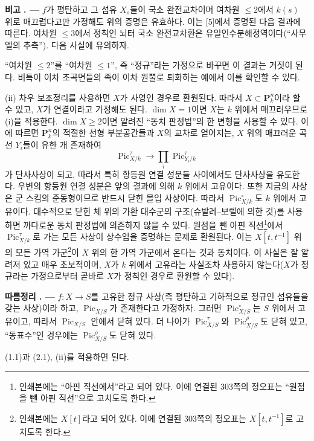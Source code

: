 \documentclass[11pt,twoside,openany]{book}
\numberwithin{equation}{section}
\newcommand{\sourceunit}{front}
\newcommand{\src}[1]{%
  \phantomsection\hypertarget{src:\sourceunit:#1}{}%
  \marginpar{\raggedleft\footnotesize\sffamily #1}%
}
\theoremstyle{plain}
\theoremstyle{definition}
\theoremstyle{remark}
\newcommand{\result}[2]{%
  \par\medskip\noindent\textbf{#1%
  \if\relax\detokenize{#2}\relax\else\space#2\fi. ---}\enspace
}
\begin{document}
\result{비고}{2.2} $f$가 평탄하고 그 섬유 $X_s$들이 국소 완전교차이며
여차원 $\leq2$에서 $k(s)$ 위로 매끄럽다고만 가정해도 위의 증명은 유효하다.
이는 [5]에서 증명된 다음 결과에 따른다. 여차원 $\leq3$에서 정칙인 뇌터
국소 완전교차환은 유일인수분해정역이다(``사무엘의 추측''). 다음 사실에
유의하자.

\src{232}
``여차원 $\leq2$''를 ``여차원 $\leq1$'', 즉 ``정규''라는 가정으로
바꾸면 이 결과는 거짓이 된다. 비특이 이차 초곡면들의 족이 이차 원뿔로
퇴화하는 예에서 이를 확인할 수 있다.

(ii) 차우 보조정리를 사용하면 $X$가 사영인 경우로 환원된다. 따라서
$X\subset\mathbf P_k^n$이라 할 수 있고, $X$가 연결이라고 가정해도 된다.
$\dim X=1$이면 $X$는 $k$ 위에서 매끄러우므로 (i)을 적용한다.
$\dim X\geq2$이면 알려진 ``동치 판정법''의 한 변형을 사용할 수 있다. 이에
따르면 $\mathbf P_k^n$의 적절한 선형 부분공간들과 $X$의 교차로 얻어지는,
$X$ 위의 매끄러운 곡선 $Y_i$들이 유한 개 존재하여
\[
\operatorname{Pic}_{X/k}^\tau\longrightarrow
\prod_i\operatorname{Pic}_{Y_i/k}^\tau
\]
가 단사사상이 되고, 따라서 특히 항등원 연결 성분들 사이에서도 단사사상을
유도한다. 우변의 항등원 연결 성분은 앞의 결과에 의해 $k$ 위에서 고유이다.
또한 지금의 사상은 군 스킴의 준동형이므로 반드시 닫힌 몰입 사상이다. 따라서
$\operatorname{Pic}_{X/k}^\circ$도 $k$ 위에서 고유이다. 대수적으로 닫힌 체
위의 가환 대수군의 구조(슈발레--보렐에 의한 것)를 사용하면 까다로운 동치
판정법에 의존하지 않을 수 있다. 원점을 뺀 아핀 직선\footnote{인쇄본에는
``아핀 직선에서''라고 되어 있다. 이에 연결된 303쪽의 정오표는 ``원점을 뺀
아핀 직선''으로 고치도록 한다.}에서 $\operatorname{Pic}_{X/k}^\tau$로 가는
모든 사상이 상수임을 증명하는 문제로 환원된다. 이는
$X[t,t^{-1}]$ 위의 모든 가역 가군\footnote{인쇄본에는 $X[t]$라고 되어
있다. 이에 연결된 303쪽의 정오표는 $X[t,t^{-1}]$로 고치도록 한다.}이 $X$
위의 한 가역 가군에서 온다는 것과 동치이다. 이 사실은 잘 알려져 있고 매우
초보적이며, $X$가 $k$ 위에서 고유라는 사실조차 사용하지 않는다($X$가
정규라는 가정으로부터 곧바로 $X$가 정칙인 경우로 환원할 수 있다).

\result{따름정리}{2.3} $f:X\longrightarrow S$를 고유한 정규 사상(즉
평탄하고 기하적으로 정규인 섬유들을 갖는 사상)이라 하고,
$\operatorname{Pic}_{X/S}$가 존재한다고 가정하자. 그러면
$\operatorname{Pic}_{X/S}^\circ$는 $S$ 위에서 고유이고, 따라서
$\operatorname{Pic}_{X/S}$ 안에서 닫혀 있다. 더 나아가
$\operatorname{Pic}_{X/S}^\tau$와 $\operatorname{Pic}_{X/S}^\rho$도
닫혀 있고, ``동표수''인 경우에는 $\operatorname{Pic}_{X/S}^\sigma$도
닫혀 있다.

(1.1)과 (2.1), (ii)를 적용하면 된다.
\end{document}
